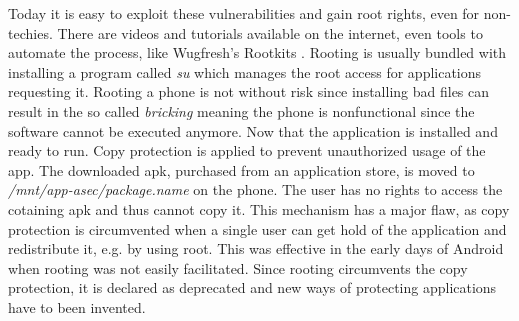 Today it is easy to exploit these vulnerabilities and gain root rights, even for non-techies.
There are videos and tutorials available on the internet, even tools to automate the process, like Wugfresh's Rootkits \cite{wugfresh}.
Rooting is usually bundled with installing a program called \textit{su} which manages the root access for applications requesting it.
Rooting a phone is not without risk since installing bad files can result in the so called \textit{bricking} meaning the phone is nonfunctional since the software cannot be executed anymore. \cite{androidpoliceRoot}
\newline
Now that the application is installed and ready to run.
Copy protection is applied to prevent unauthorized usage of the app.
The downloaded \gls{apk}, purchased from an application store, is moved to \textit{/mnt/app-asec/package.name} on the phone.
The user has no rights to access the cotaining \gls{apk} and thus cannot copy it.
This mechanism has a major flaw, as copy protection is circumvented when a single user can get hold of the application and redistribute it, e.g. by using root.
This was effective in the early days of Android when rooting was not easily facilitated.
\newline
Since rooting circumvents the copy protection, it is declared as deprecated and new ways of protecting applications have to been invented.
